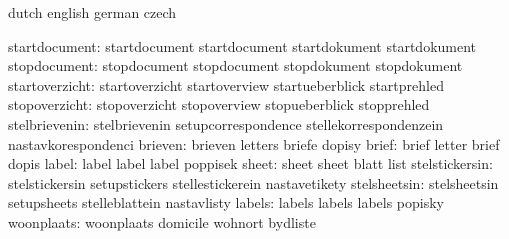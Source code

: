 


\startcommands                  dutch                        english
                                german                       czech

                startdocument:  startdocument                startdocument
                                startdokument                startdokument
                 stopdocument:  stopdocument                 stopdocument
                                stopdokument                 stopdokument
               startoverzicht:  startoverzicht               startoverview
                                startueberblick              startprehled
                stopoverzicht:  stopoverzicht                stopoverview
                                stopueberblick               stopprehled
                stelbrievenin:  stelbrievenin                setupcorrespondence
                                stellekorrespondenzein       nastavkorespondenci
                      brieven:  brieven                      letters
                                briefe                       dopisy
                        brief:  brief                        letter
                                brief                        dopis
                        label:  label                        label
                                label                        poppisek
                        sheet:  sheet                        sheet
                                blatt                        list
               stelstickersin:  stelstickersin               setupstickers
                                stellestickerein             nastavetikety
                 stelsheetsin:  stelsheetsin                 setupsheets
                                stelleblattein               nastavlisty
                       labels:  labels                       labels
                                labels                       popisky
                   woonplaats:  woonplaats                   domicile
                                wohnort                      bydliste

\stopcommands


\stoplogginginterface

\endinput
